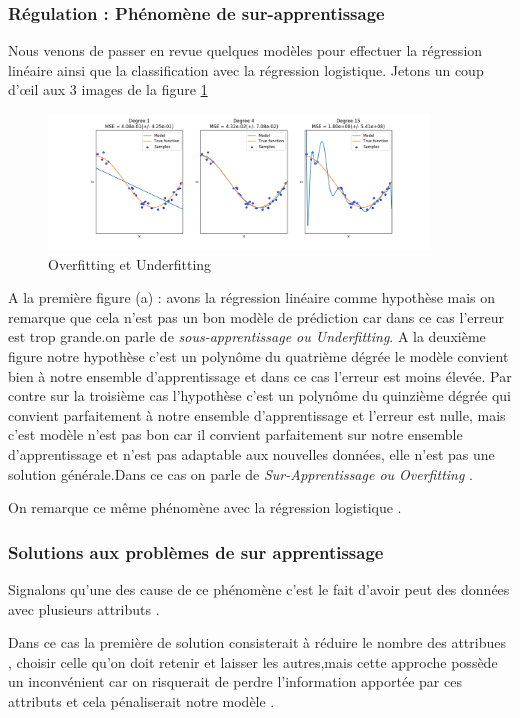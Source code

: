 \subsubsection{Régulation : Phénomène de sur-apprentissage}
Nous venons de passer en revue quelques modèles pour  effectuer la régression linéaire ainsi que la classification avec la régression logistique.
Jetons un coup d'œil aux 3 images de la figure \ref{fig:image8}  \\
\begin{figure}[H]
	\centering
	\includegraphics[width=0.9\textwidth]{fig/underfitting2.png}
	\caption{Overfitting et Underfitting  }
	\label{fig:image8}
\end{figure}
A la première figure (a) : avons la régression linéaire comme hypothèse  mais on remarque que cela n'est pas un bon modèle de prédiction car dans ce cas l'erreur est trop grande.on parle de \emph{sous-apprentissage ou Underfitting}.
A la deuxième figure notre hypothèse c'est un polynôme du quatrième  dégrée le modèle convient bien à notre ensemble d'apprentissage et dans ce cas l'erreur est moins élevée.
Par contre sur la troisième cas l'hypothèse c'est un polynôme du quinzième  dégrée qui convient parfaitement à notre ensemble d'apprentissage et l'erreur est nulle, mais c'est modèle n'est pas bon  car il  convient parfaitement sur notre ensemble d'apprentissage et n'est pas adaptable aux nouvelles données, elle n'est pas une solution générale.Dans ce cas on parle de \emph{Sur-Apprentissage ou Overfitting } .

On remarque ce même phénomène avec la régression logistique .
\subsubsection{Solutions aux problèmes de sur apprentissage }
Signalons qu'une des cause de ce phénomène c'est le fait d'avoir peut des données avec plusieurs attributs .

Dans ce cas la première de solution consisterait à réduire le nombre des attribues , choisir celle qu'on doit retenir et laisser les autres,mais cette approche possède un inconvénient car on risquerait de perdre l'information apportée par ces attributs et cela pénaliserait notre modèle .

